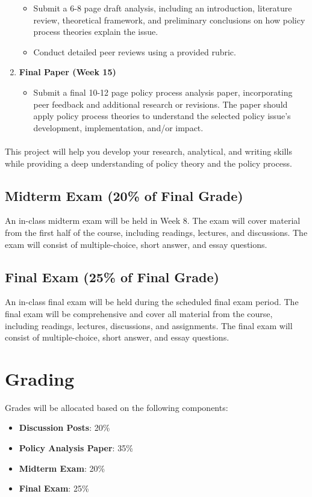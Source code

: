 \documentclass[12pt, letterpaper]{article}
\begin{document}
\begin{enumerate}
\begin{itemize}
        \item Submit a 6-8 page draft analysis, including an introduction, literature review, theoretical framework, and preliminary conclusions on how policy process theories explain the issue.
        \item Conduct detailed peer reviews using a provided rubric.
    \end{itemize}
    \item \textbf{Final Paper (Week 15)}
    \begin{itemize}
        \item Submit a final 10-12 page policy process analysis paper, incorporating peer feedback and additional research or revisions. The paper should apply policy process theories to understand the selected policy issue's development, implementation, and/or impact.
    \end{itemize}
\end{enumerate}

\paragraph{} This project will help you develop your research, analytical, and writing skills while providing a deep understanding of policy theory and the policy process.


\subsection*{Midterm Exam (20\% of Final Grade)}
An in-class midterm exam will be held in Week 8. The exam will cover material from the first half of the course, including readings, lectures, and discussions. The exam will consist of multiple-choice, short answer, and essay questions.

\subsection*{Final Exam (25\% of Final Grade)}
An in-class final exam will be held during the scheduled final exam period. The final exam will be comprehensive and cover all material from the course, including readings, lectures, discussions, and assignments. The final exam will consist of multiple-choice, short answer, and essay questions.

\section{Grading}
Grades will be allocated based on the following components:
\begin{itemize}
    \item \textbf{Discussion Posts}: 20\%
    \item \textbf{Policy Analysis Paper}: 35\%
    \item \textbf{Midterm Exam}: 20\%
    \item \textbf{Final Exam}: 25\%    
\end{itemize}
\end{document}
